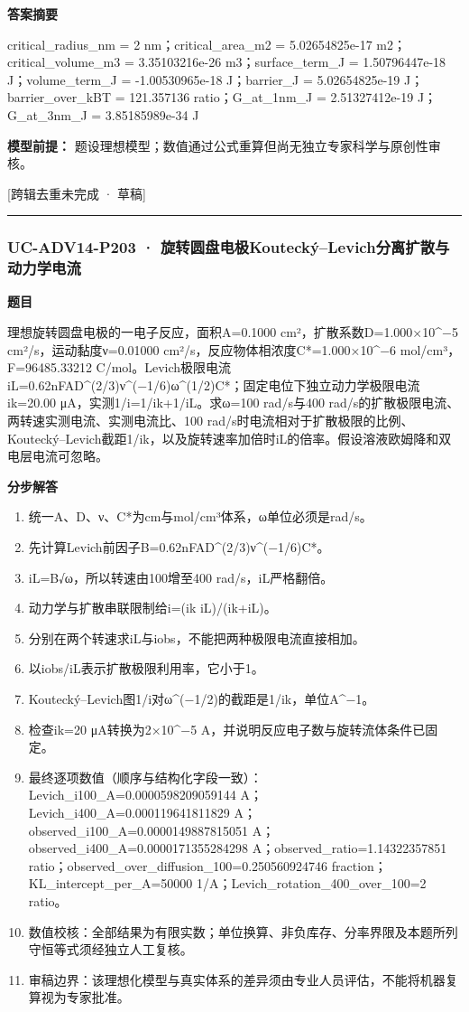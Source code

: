 \documentclass[UTF8,11pt,a4paper]{ctexart}
\begin{document}
\noindent\textbf{答案摘要}\par
critical\_radius\_nm = 2 nm；critical\_area\_m2 = 5.02654825e-17 m2；critical\_volume\_m3 = 3.35103216e-26 m3；surface\_term\_J = 1.50796447e-18 J；volume\_term\_J = -1.00530965e-18 J；barrier\_J = 5.02654825e-19 J；barrier\_over\_kBT = 121.357136 ratio；G\_at\_1nm\_J = 2.51327412e-19 J；G\_at\_3nm\_J = 3.85185989e-34 J\par
\noindent\textbf{模型前提：}
题设理想模型；数值通过公式重算但尚无独立专家科学与原创性审核。\par
\noindent\textcolor{red!65!black}{[跨辑去重未完成 · 草稿]} \par
\medskip\hrule\medskip
{}
\subsubsection*{UC-ADV14-P203 · 旋转圆盘电极Koutecký–Levich分离扩散与动力学电流}
\noindent\textbf{题目}\par
理想旋转圆盘电极的一电子反应，面积A=0.1000 cm²，扩散系数D=1.000×10\textasciicircum{}−5 cm²/s，运动黏度ν=0.01000 cm²/s，反应物体相浓度C*=1.000×10\textasciicircum{}−6 mol/cm³，F=96485.33212 C/mol。Levich极限电流iL=0.62nFAD\textasciicircum{}(2/3)ν\textasciicircum{}(−1/6)ω\textasciicircum{}(1/2)C*；固定电位下独立动力学极限电流ik=20.00 μA，实测1/i=1/ik+1/iL。求ω=100 rad/s与400 rad/s的扩散极限电流、两转速实测电流、实测电流比、100 rad/s时电流相对于扩散极限的比例、Koutecký–Levich截距1/ik，以及旋转速率加倍时iL的倍率。假设溶液欧姆降和双电层电流可忽略。\par
\medskip\noindent\textbf{分步解答}
\begin{enumerate}
\item 统一A、D、ν、C*为cm与mol/cm³体系，ω单位必须是rad/s。
\item 先计算Levich前因子B=0.62nFAD\textasciicircum{}(2/3)ν\textasciicircum{}(−1/6)C*。
\item iL=B√ω，所以转速由100增至400 rad/s，iL严格翻倍。
\item 动力学与扩散串联限制给i=(ik iL)/(ik+iL)。
\item 分别在两个转速求iL与iobs，不能把两种极限电流直接相加。
\item 以iobs/iL表示扩散极限利用率，它小于1。
\item Koutecký–Levich图1/i对ω\textasciicircum{}(−1/2)的截距是1/ik，单位A\textasciicircum{}−1。
\item 检查ik=20 μA转换为2×10\textasciicircum{}−5 A，并说明反应电子数与旋转流体条件已固定。
\item 最终逐项数值（顺序与结构化字段一致）：Levich\_i100\_A=0.0000598209059144 A；Levich\_i400\_A=0.000119641811829 A；observed\_i100\_A=0.0000149887815051 A；observed\_i400\_A=0.0000171355284298 A；observed\_ratio=1.14322357851 ratio；observed\_over\_diffusion\_100=0.250560924746 fraction；KL\_intercept\_per\_A=50000 1/A；Levich\_rotation\_400\_over\_100=2 ratio。
\item 数值校核：全部结果为有限实数；单位换算、非负库存、分率界限及本题所列守恒等式须经独立人工复核。
\item 审稿边界：该理想化模型与真实体系的差异须由专业人员评估，不能将机器复算视为专家批准。
\end{enumerate}
\end{document}
